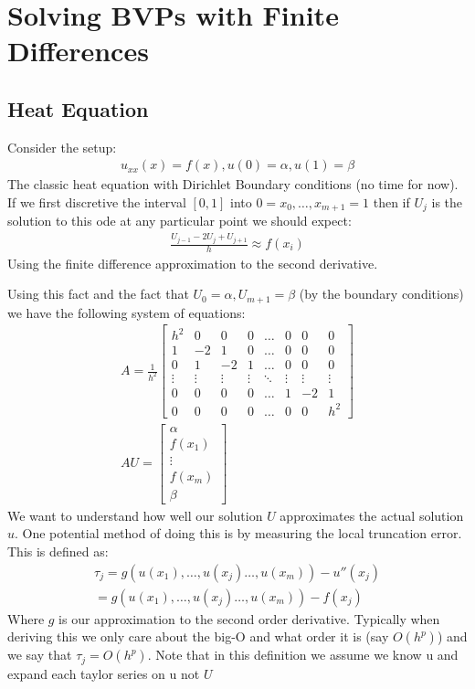 \documentclass[12pt]{article}
\begin{document}
\section{Solving BVPs with Finite Differences}
\subsection{Heat Equation}

Consider the setup:
\begin{align}
	u_{xx}(x)=f(x), u(0)=\alpha,u(1)=\beta
\end{align}
The classic heat equation with Dirichlet Boundary conditions (no time for now). If we first discretive the interval $[0,1]$ into $0=x_0,\dots,x_{m+1}=1$ then if $U_j$ is the solution to this ode at any particular point we should expect:
\begin{align}
	\frac{U_{j-1}-2U_j+U_{j+1}}{h}\approx f(x_i)
\end{align}
Using the finite difference approximation to the second derivative.

Using this fact and the fact that $U_0=\alpha, U_{m+1}=\beta$ (by the boundary conditions) we have the following system of equations:
\begin{align}
	A=\frac{1}{h^2}\begin{bmatrix}
		               h^2    & 0      & 0      & 0      & \dots  & 0      & 0      & 0      \\
		               1      & -2     & 1      & 0      & \dots  & 0      & 0      & 0      \\
		               0      & 1      & -2     & 1      & \dots  & 0      & 0      & 0      \\
		               \vdots & \vdots & \vdots & \vdots & \ddots & \vdots & \vdots & \vdots \\
		               0      & 0      & 0      & 0      & \dots  & 1      & -2     & 1      \\
		               0      & 0      & 0      & 0      & \dots  & 0      & 0      & h^2
	               \end{bmatrix} \\
	AU=\begin{bmatrix}
		   \alpha \\
		   f(x_1) \\
		   \vdots \\
		   f(x_m) \\
		   \beta
	   \end{bmatrix}
\end{align}
We want to understand how well our solution $U$ approximates the actual solution $u$. One potential method of doing this is by measuring the local truncation error. This is defined as:
\begin{align}
	\tau_j=g(u(x_1),\dots, u(x_j)\dots, u(x_m))-u''(x_j) \\
	=g(u(x_1),\dots, u(x_j)\dots, u(x_m))-f(x_j)
\end{align}
Where $g$ is our approximation to the second order derivative. Typically when deriving this we only care about the big-O and what order it is (say $O(h^p)$) and we say that $\tau_j=O(h^p)$. Note that in this definition we assume we know u and expand each taylor series on u not $U$
\end{document}
